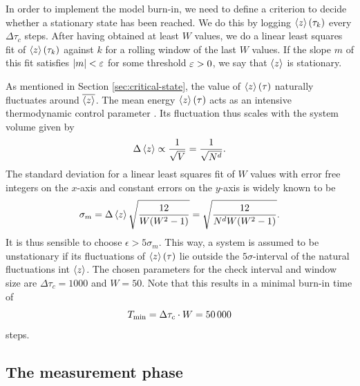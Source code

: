 In order to implement the model burn-in, we need to define a criterion to decide whether a stationary state has been reached. We do this by logging $\expval{z}(\tau_k)$ every $\Delta\tau_c$ steps. After having obtained at least $W$ values, we do a linear least squares fit of $\expval{z}(\tau_k)$ against $k$ for a rolling window of the last $W$ values. If the slope $m$ of this fit satisfies $\abs{m}<\varepsilon$ for some threshold $\varepsilon > 0$, we say that $\expval{z}$ is stationary.

As mentioned in Section \ref{sec:critical-state}, the value of $\expval{z}(\tau)$ naturally fluctuates around $\overline{\expval{z}}$. The mean energy $\expval{z}(\tau)$ acts as an intensive thermodynamic control parameter \cite{vespignani1998how}. Its fluctuation thus scales with the system volume \cite{landau1969fluctuations} given by
\begin{equation}
    \Delta\expval{z} \propto \frac{1}{\sqrt{V}} = \frac{1}{\sqrt{N^d}}.
\end{equation}
The standard deviation for a linear least squares fit of $W$ values with error free integers on the $x$-axis and constant errors on the $y$-axis is widely known \cite{bevington2003data} to be
\begin{equation}
    \sigma_m = \Delta\expval{z}\sqrt{\frac{12}{W(W^2-1)}} = \sqrt{\frac{12}{N^dW(W^2-1)}}.
\end{equation}
It is thus sensible to choose $\epsilon > 5\sigma_m$. This way, a system is assumed to be unstationary if its fluctuations of $\expval{z}(\tau)$ lie outside the $5\sigma$-interval of the natural fluctuations int $\expval{z}$. The chosen parameters for the check interval and window size are $\Delta\tau_c=1000$ and $W=50$. Note that this results in a minimal burn-in time of
\begin{equation}
    T_{\mathrm{min}} = \Delta\tau_c\cdot W = \num{50000} \label{eqn:minimal-burnin}
\end{equation}
steps.

\subsection{The measurement phase}


